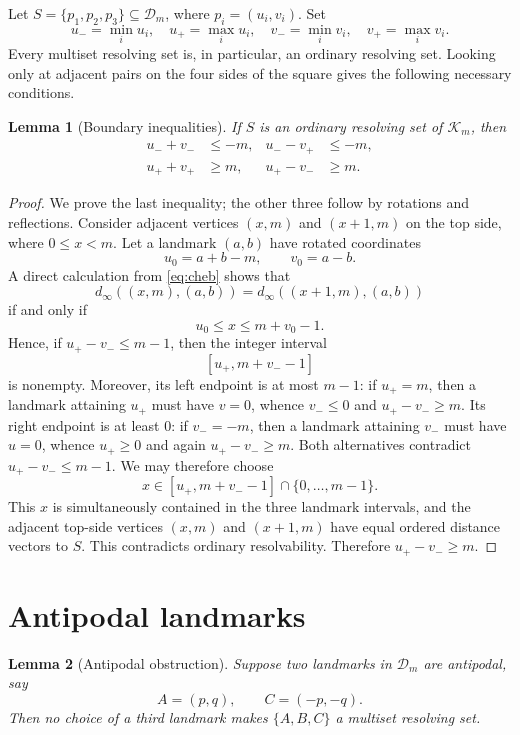 \documentclass[11pt]{amsart}
\newtheorem{lemma}[lemma]{Lemma}
\theoremstyle{remark}
\newcommand{\dist}{d}
\newcommand{\King}{\mathcal K}
\newcommand{\D}{\mathcal D}
\begin{document}
Let $S=\{p_1,p_2,p_3\}\subseteq\D_m$, where $p_i=(u_i,v_i)$.  Set
\[
 u_- =\min_i u_i,
 \quad u_+=\max_i u_i,
 \quad v_- =\min_i v_i,
 \quad v_+=\max_i v_i.
\]
Every multiset resolving set is, in particular, an ordinary resolving set.  Looking only at adjacent pairs on the four sides of the square gives the following necessary conditions.

\begin{lemma}[Boundary inequalities]\label{lem:boundary}
If $S$ is an ordinary resolving set of $\King_m$, then
\begin{equation}\label{eq:boundaryineq}
\begin{aligned}
 u_-+v_-&\le -m, &
 u_- -v_+&\le -m,\\
 u_++v_+&\ge m, &
 u_+-v_-&\ge m.
\end{aligned}
\end{equation}
\end{lemma}

\begin{proof}
We prove the last inequality; the other three follow by rotations and reflections.  Consider adjacent vertices $(x,m)$ and $(x+1,m)$ on the top side, where $0\le x<m$.  Let a landmark $(a,b)$ have rotated coordinates
\[
 u_0=a+b-m,
 \qquad
 v_0=a-b.
\]
A direct calculation from \eqref{eq:cheb} shows that
\[
 \dist_\infty((x,m),(a,b))
 =\dist_\infty((x+1,m),(a,b))
\]
if and only if
\[
 u_0\le x\le m+v_0-1.
\]
Hence, if $u_+-v_-\le m-1$, then the integer interval
\[
 [u_+,m+v_--1]
\]
is nonempty.  Moreover, its left endpoint is at most $m-1$: if $u_+=m$, then a landmark attaining $u_+$ must have $v=0$, whence $v_-\le0$ and $u_+-v_-\ge m$.  Its right endpoint is at least $0$: if $v_-=-m$, then a landmark attaining $v_-$ must have $u=0$, whence $u_+\ge0$ and again $u_+-v_-\ge m$.  Both alternatives contradict $u_+-v_-\le m-1$.  We may therefore choose
\[
 x\in [u_+,m+v_--1]\cap\{0,\dots,m-1\}.
\]
This $x$ is simultaneously contained in the three landmark intervals, and the adjacent top-side vertices $(x,m)$ and $(x+1,m)$ have equal ordered distance vectors to $S$.  This contradicts ordinary resolvability.  Therefore $u_+-v_-\ge m$.
\end{proof}

\section{Antipodal landmarks}\label{sec:antipodal}

\begin{lemma}[Antipodal obstruction]\label{lem:antipodal}
Suppose two landmarks in $\D_m$ are antipodal, say
\[
 A=(p,q),
 \qquad
 C=(-p,-q).
\]
Then no choice of a third landmark makes $\{A,B,C\}$ a multiset resolving set.
\end{lemma}
\end{document}
